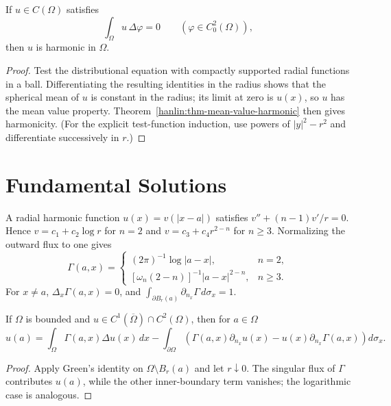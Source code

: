 \begin{theorem}\label{hanlin:thm-distributional-harmonic}
If $u\in C(\Omega)$ satisfies
\[
\int_\Omega u\,\Delta\varphi=0\qquad(\varphi\in C_0^2(\Omega)),
\]
then $u$ is harmonic in $\Omega$.
\end{theorem}
\begin{proof}
\sketch Test the distributional equation with compactly supported radial
functions in a ball. Differentiating the resulting identities in the radius
shows that the spherical mean of $u$ is constant in the radius; its limit at
zero is $u(x)$, so $u$ has the mean value property. Theorem~\ref{hanlin:thm-mean-value-harmonic}
then gives harmonicity. (For the explicit test-function induction, use powers
of $|y|^2-r^2$ and differentiate successively in $r$.)
\end{proof}

\section{Fundamental Solutions}

A radial harmonic function $u(x)=v(|x-a|)$ satisfies
$v''+(n-1)v'/r=0$. Hence $v=c_1+c_2\log r$ for $n=2$ and
$v=c_3+c_4r^{2-n}$ for $n\ge3$. Normalizing the outward flux to one gives
\[
\Gamma(a,x)=
\begin{cases}
 (2\pi)^{-1}\log|a-x|,&n=2,\\
 [\omega_n(2-n)]^{-1}|a-x|^{2-n},&n\ge3.
\end{cases}
\]
For $x\ne a$, $\Delta_x\Gamma(a,x)=0$, and
$\int_{\partial B_r(a)}\partial_{n_x}\Gamma\,d\sigma_x=1$.

\begin{theorem}\label{hanlin:thm-green-identity}
If $\Omega$ is bounded and $u\in C^1(\overline\Omega)\cap C^2(\Omega)$, then
for $a\in\Omega$
\[
u(a)=\int_\Omega\Gamma(a,x)\Delta u(x)\,dx-
\int_{\partial\Omega}\left(\Gamma(a,x)\partial_{n_x}u(x)-u(x)\partial_{n_x}\Gamma(a,x)\right)d\sigma_x.
\]
\end{theorem}
\begin{proof}
\sketch Apply Green's identity on $\Omega\setminus B_r(a)$ and let $r\downarrow0$.
The singular flux of $\Gamma$ contributes $u(a)$, while the other inner-boundary
term vanishes; the logarithmic case is analogous.
\end{proof}

